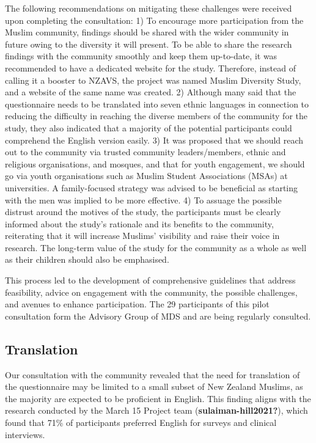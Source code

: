 \documentclass[
]{interact}
\begin{document}
The following recommendations on mitigating these challenges were
received upon completing the consultation: 1) To encourage more
participation from the Muslim community, findings should be shared with
the wider community in future owing to the diversity it will present. To
be able to share the research findings with the community smoothly and
keep them up-to-date, it was recommended to have a dedicated website for
the study. Therefore, instead of calling it a booster to NZAVS, the
project was named Muslim Diversity Study, and a website of the same name
was created. 2) Although many said that the questionnaire needs to be
translated into seven ethnic languages in connection to reducing the
difficulty in reaching the diverse members of the community for the
study, they also indicated that a majority of the potential participants
could comprehend the English version easily. 3) It was proposed that we
should reach out to the community via trusted community leaders/members,
ethnic and religious organisations, and mosques, and that for youth
engagement, we should go via youth organisations such as Muslim Student
Associations (MSAs) at universities. A family-focused strategy was
advised to be beneficial as starting with the men was implied to be more
effective. 4) To assuage the possible distrust around the motives of the
study, the participants must be clearly informed about the study's
rationale and its benefits to the community, reiterating that it will
increase Muslims' visibility and raise their voice in research. The
long-term value of the study for the community as a whole as well as
their children should also be emphasised.

This process led to the development of comprehensive guidelines that
address feasibility, advice on engagement with the community, the
possible challenges, and avenues to enhance participation. The 29
participants of this pilot consultation form the Advisory Group of MDS
and are being regularly consulted.

\subsection{Translation}\label{translation}

Our consultation with the community revealed that the need for
translation of the questionnaire may be limited to a small subset of New
Zealand Muslims, as the majority are expected to be proficient in
English. This finding aligns with the research conducted by the March 15
Project team (\textbf{sulaiman-hill2021?}), which found that 71\% of
participants preferred English for surveys and clinical interviews.
\end{document}
